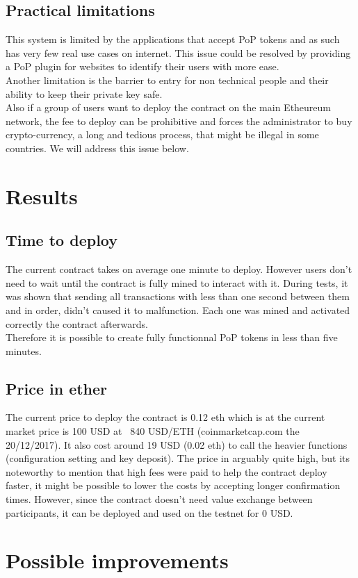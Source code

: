 \documentclass[11pt, a4paper, twoside, openright]{book} %
\begin{document}
\subsection{Practical limitations}
This system is limited by the applications that accept PoP tokens and as such has very few real use cases on internet. This issue could be resolved by providing a PoP plugin for websites to identify their users with more ease. \\
Another limitation is the barrier to entry for non technical people and their ability to keep their private key safe.\\
Also if a group of users want to deploy the contract on the main Etheureum network, the fee to deploy can be prohibitive and forces the administrator to buy crypto-currency, a long and tedious process, that might be illegal in some countries. We will address this issue below.
\section{Results}
\subsection{Time to deploy}
The current contract takes on average one minute to deploy. However users don't need to wait until the contract is fully mined to interact with it. During tests, it was shown that sending all transactions with less than one second between them and in order, didn't caused it to malfunction. Each one was mined and activated correctly the contract afterwards. \\
Therefore it is possible to create fully functionnal PoP tokens in less than five minutes.
\subsection{Price in ether}
The current price to deploy the contract is 0.12 eth which is at the current market price is 100 USD at ~840 USD/ETH (coinmarketcap.com the 20/12/2017). It also cost around 19 USD (0.02 eth) to call the heavier functions (configuration setting and key deposit). The price in arguably quite high, but its noteworthy to mention that high fees were paid to help the contract deploy faster, it might be possible to lower the costs by accepting longer confirmation times. However, since the contract doesn't need value exchange between participants, it can be deployed and used on the testnet for 0 USD.
\section{Possible improvements}
\end{document}
